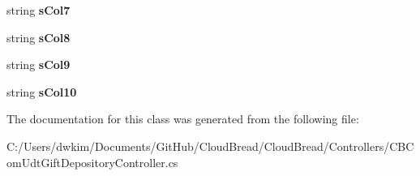 \begin{DoxyCompactItemize}
\item 
string {\bfseries s\+Col7}\hypertarget{class_cloud_bread_1_1_controllers_1_1_c_b_com_udt_gift_depository_controller_1_1_input_params_ab43bfe2641353ec0eda34716cdd2d086}{}\label{class_cloud_bread_1_1_controllers_1_1_c_b_com_udt_gift_depository_controller_1_1_input_params_ab43bfe2641353ec0eda34716cdd2d086}

\item 
string {\bfseries s\+Col8}\hypertarget{class_cloud_bread_1_1_controllers_1_1_c_b_com_udt_gift_depository_controller_1_1_input_params_ad457c896d60ecc35a9bba7e038b78ced}{}\label{class_cloud_bread_1_1_controllers_1_1_c_b_com_udt_gift_depository_controller_1_1_input_params_ad457c896d60ecc35a9bba7e038b78ced}

\item 
string {\bfseries s\+Col9}\hypertarget{class_cloud_bread_1_1_controllers_1_1_c_b_com_udt_gift_depository_controller_1_1_input_params_a4840d65eef80346a26ef933f9d5c42de}{}\label{class_cloud_bread_1_1_controllers_1_1_c_b_com_udt_gift_depository_controller_1_1_input_params_a4840d65eef80346a26ef933f9d5c42de}

\item 
string {\bfseries s\+Col10}\hypertarget{class_cloud_bread_1_1_controllers_1_1_c_b_com_udt_gift_depository_controller_1_1_input_params_af10e605c373087ab258e1c12ba9af58d}{}\label{class_cloud_bread_1_1_controllers_1_1_c_b_com_udt_gift_depository_controller_1_1_input_params_af10e605c373087ab258e1c12ba9af58d}

\end{DoxyCompactItemize}


The documentation for this class was generated from the following file\+:\begin{DoxyCompactItemize}
\item 
C\+:/\+Users/dwkim/\+Documents/\+Git\+Hub/\+Cloud\+Bread/\+Cloud\+Bread/\+Controllers/C\+B\+Com\+Udt\+Gift\+Depository\+Controller.\+cs\end{DoxyCompactItemize}
